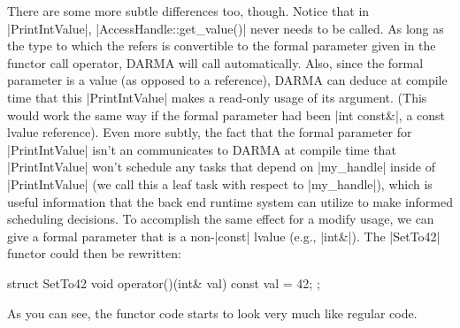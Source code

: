 There are some more subtle differences
too, though.  Notice that in |PrintIntValue|, |AccessHandle::get_value()| never
needs to be called.  As long as the type to which the  refers is
convertible to the formal parameter given in the functor call operator,
\gls{DARMA} will call  automatically.  Also, since the formal parameter is a
value (as opposed to a reference), \gls{DARMA} can deduce at compile time that this
|PrintIntValue| makes a read-only usage of its argument.  (This would work the
same way if the formal parameter had been |int const&|, a const lvalue
reference).  Even more subtly, the fact that the formal parameter for
|PrintIntValue| isn't an  communicates to \gls{DARMA} at compile time
that |PrintIntValue| won't schedule any \glspl{task} that depend on |my_handle| inside
of |PrintIntValue| (we call this a \gls{leaf task} with respect to |my_handle|),
which is useful information that the \gls{back end} \gls{runtime system} can utilize to make informed
scheduling decisions.  To accomplish the same effect for a modify usage, we can
give a formal parameter that is a non-|const| lvalue (e.g., |int&|).  The
|SetTo42| functor could then be rewritten:
\begin{CppCodeNumb}
struct SetTo42 {
  void operator()(int& val) const {
    val = 42;
  }
};
\end{CppCodeNumb}
As you can see, the functor code starts to look very much like regular \CC{} code.

